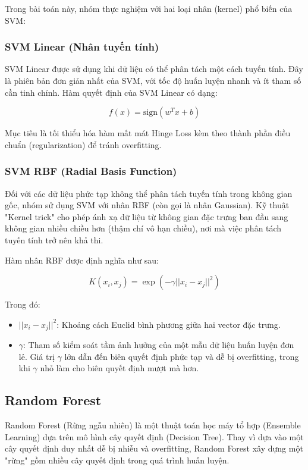 \documentclass[a4paper,12pt]{report}
\begin{document}
Trong bài toán này, nhóm thực nghiệm với hai loại nhân (kernel) phổ biến của SVM:

\subsubsection{SVM Linear (Nhân tuyến tính)}
SVM Linear được sử dụng khi dữ liệu có thể phân tách một cách tuyến tính. Đây là phiên bản đơn giản nhất của SVM, với tốc độ huấn luyện nhanh và ít tham số cần tinh chỉnh. Hàm quyết định của SVM Linear có dạng:

\begin{equation}
    f(x) = \text{sign}(w^T x + b)
\end{equation}

Mục tiêu là tối thiểu hóa hàm mất mát Hinge Loss kèm theo thành phần điều chuẩn (regularization) để tránh overfitting.

\subsubsection{SVM RBF (Radial Basis Function)}
Đối với các dữ liệu phức tạp không thể phân tách tuyến tính trong không gian gốc, nhóm sử dụng SVM với nhân RBF (còn gọi là nhân Gaussian). Kỹ thuật "Kernel trick" cho phép ánh xạ dữ liệu từ không gian đặc trưng ban đầu sang không gian nhiều chiều hơn (thậm chí vô hạn chiều), nơi mà việc phân tách tuyến tính trở nên khả thi.

Hàm nhân RBF được định nghĩa như sau:

\begin{equation}
    K(x_i, x_j) = \exp(-\gamma ||x_i - x_j||^2)
\end{equation}

Trong đó:
\begin{itemize}
    \item $||x_i - x_j||^2$: Khoảng cách Euclid bình phương giữa hai vector đặc trưng.
    \item $\gamma$: Tham số kiểm soát tầm ảnh hưởng của một mẫu dữ liệu huấn luyện đơn lẻ. Giá trị $\gamma$ lớn dẫn đến biên quyết định phức tạp và dễ bị overfitting, trong khi $\gamma$ nhỏ làm cho biên quyết định mượt mà hơn.
\end{itemize}

\subsection{Random Forest}
Random Forest (Rừng ngẫu nhiên) là một thuật toán học máy tổ hợp (Ensemble Learning) dựa trên mô hình cây quyết định (Decision Tree). Thay vì dựa vào một cây quyết định duy nhất dễ bị nhiễu và overfitting, Random Forest xây dựng một "rừng" gồm nhiều cây quyết định trong quá trình huấn luyện.
\end{document}
